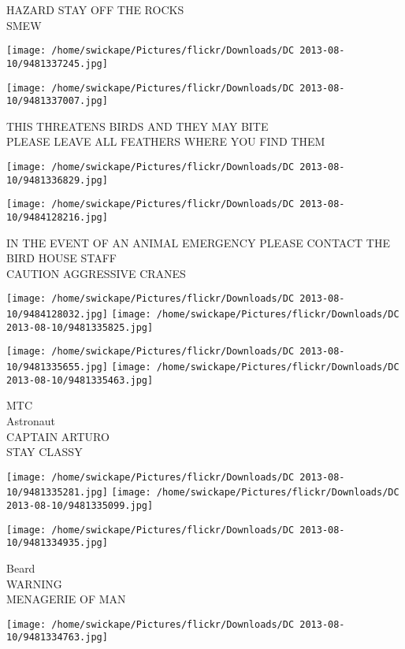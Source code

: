 \documentclass[10pt,letterpaper]{article}
\begin{document}
HAZARD STAY OFF THE ROCKS\\
SMEW
\pagebreak

\texttt{[image: /home/swickape/Pictures/flickr/Downloads/DC 2013-08-10/9481337245.jpg]}

\vspace{0.25in}
\texttt{[image: /home/swickape/Pictures/flickr/Downloads/DC 2013-08-10/9481337007.jpg]}

THIS THREATENS BIRDS AND THEY MAY BITE\\
PLEASE LEAVE ALL FEATHERS WHERE YOU FIND THEM
\pagebreak

\texttt{[image: /home/swickape/Pictures/flickr/Downloads/DC 2013-08-10/9481336829.jpg]}

\vspace{0.25in}
\texttt{[image: /home/swickape/Pictures/flickr/Downloads/DC 2013-08-10/9484128216.jpg]}

IN THE EVENT OF AN ANIMAL EMERGENCY PLEASE CONTACT THE BIRD HOUSE STAFF\\
CAUTION AGGRESSIVE CRANES
\pagebreak

\texttt{[image: /home/swickape/Pictures/flickr/Downloads/DC 2013-08-10/9484128032.jpg]}
\texttt{[image: /home/swickape/Pictures/flickr/Downloads/DC 2013-08-10/9481335825.jpg]}

\texttt{[image: /home/swickape/Pictures/flickr/Downloads/DC 2013-08-10/9481335655.jpg]}
\texttt{[image: /home/swickape/Pictures/flickr/Downloads/DC 2013-08-10/9481335463.jpg]}

MTC\\
Astronaut\\
CAPTAIN ARTURO\\
STAY CLASSY
\pagebreak

\texttt{[image: /home/swickape/Pictures/flickr/Downloads/DC 2013-08-10/9481335281.jpg]}
\texttt{[image: /home/swickape/Pictures/flickr/Downloads/DC 2013-08-10/9481335099.jpg]}

\texttt{[image: /home/swickape/Pictures/flickr/Downloads/DC 2013-08-10/9481334935.jpg]}

Beard\\
WARNING\\
MENAGERIE OF MAN
\pagebreak

\texttt{[image: /home/swickape/Pictures/flickr/Downloads/DC 2013-08-10/9481334763.jpg]}
\end{document}
